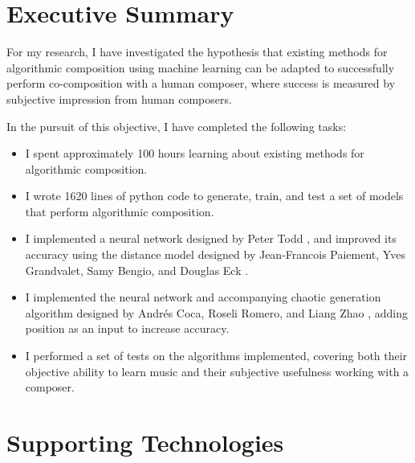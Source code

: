 \documentclass[ author={Stephen Livermore-Tozer},
				supervisor={Dr. Peter Flach},
				degree={MEng},
				title={Algorithmic Co-composition Using Machine Learning},
				subtitle={},
				type={research},
				year={2016} ]{dissertation}
\begin{document}
	
	\maketitle
	
	\frontmatter
	
	\makedecl
	
	\tableofcontents
	\listoffigures
	\listoftables
	
	
	\chapter*{Executive Summary}
	
	For my research, I have investigated the hypothesis that existing methods for algorithmic composition using machine learning can be adapted to successfully perform co-composition with a human composer, where success is measured by subjective impression from human composers. 
	
	In the pursuit of this objective, I have completed the following tasks:
	\begin{itemize}
		\item I spent approximately 100 hours learning about existing methods for algorithmic composition.
		\item I wrote 1620 lines of python code to generate, train, and test a set of models that perform algorithmic composition.
		\item I implemented a neural network designed by Peter Todd \cite{todd1989connectionist}, and improved its accuracy using the distance model designed by Jean-Francois Paiement, Yves Grandvalet, Samy Bengio, and Douglas Eck \cite{paiement2007generative}.
		\item I implemented the neural network and accompanying chaotic generation algorithm designed by Andr\'es Coca, Roseli Romero, and Liang Zhao \cite{coca2011generation}, adding position as an input to increase accuracy.
		\item I performed a set of tests on the algorithms implemented, covering both their objective ability to learn music and their subjective usefulness working with a composer.
	\end{itemize}
	
	
	
	\chapter*{Supporting Technologies}
	
\end{document}
